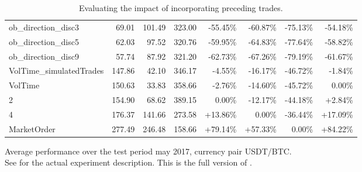 \begin{table}[ht]
{\begin{tabular}{lRRR|RRRR}
\midrule
ob\_direction\_disc3             &     69.01 &  101.49 &  323.00 &  -55.45\% &  -60.87\% &  -75.13\% &      -54.18\% \\
ob\_direction\_disc5             &     62.03 &   97.52 &  320.76 &  -59.95\% &  -64.83\% &  -77.64\% &      -58.82\% \\
ob\_direction\_disc9             &     57.74 &   87.92 &  321.20 &  -62.73\% &  -67.26\% &  -79.19\% &      -61.67\% \\
\midrule
VolTime\_simulatedTrades &    147.86 &   42.10 &  346.17 &   -4.55\% &  -16.17\% &  -46.72\% &       -1.84\% \\
VolTime                        &    150.63 &   33.83 &  358.66 &   -2.76\% &  -14.60\% &  -45.72\% &        0.00\% \\
2                              &    154.90 &   68.62 &  389.15 &    0.00\% &  -12.17\% &  -44.18\% &        +2.84\% \\
4                              &    176.37 &  141.66 &  273.58 &   +13.86\% &    0.00\% &  -36.44\% &       +17.09\% \\
MarketOrder                    &    277.49 &  246.48 &  158.66 &   +79.14\% &   +57.33\% &    0.00\% &      +84.22\% \\
\bottomrule
\end{tabular}}

        		\caption[Full version of ]{Evaluating the impact of incorporating preceding trades.}
		\small Average performance over the test period may 2017, currency pair USDT/BTC.\\		
		See  for the actual experiment description. This is the full version of .
		\label{tab:eval:additionalMarketVariables:simulatedTrades:fulltable}
\end{table}